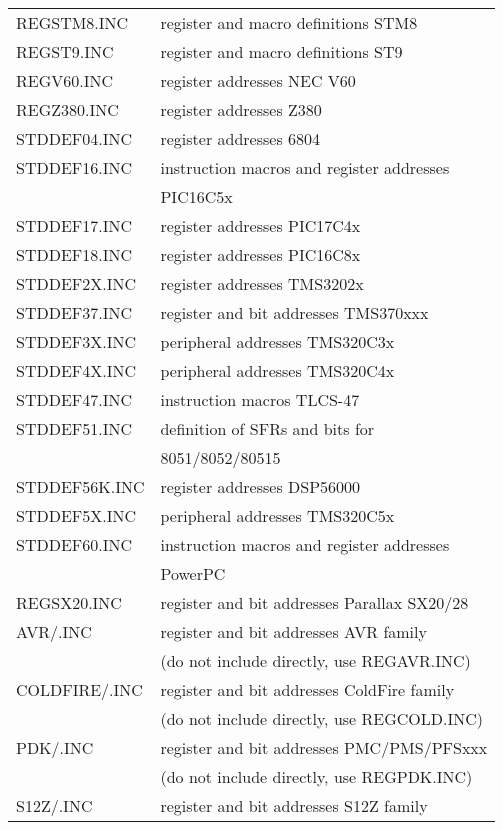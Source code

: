 \documentclass[12pt,twoside]{report}
\begin{document}
\begin{center}
\begin{longtable}{|l|l|}
REGSTM8.INC       & register and macro definitions STM8 \\
REGST9.INC        & register and macro definitions ST9 \\
REGV60.INC        & register addresses NEC V60 \\
REGZ380.INC       & register addresses Z380 \\
STDDEF04.INC      & register addresses 6804 \\
STDDEF16.INC      & instruction macros and register addresses \\
                  & PIC16C5x \\
STDDEF17.INC      & register addresses PIC17C4x \\
STDDEF18.INC      & register addresses PIC16C8x \\
STDDEF2X.INC      & register addresses TMS3202x \\
STDDEF37.INC      & register and bit addresses TMS370xxx \\
STDDEF3X.INC      & peripheral addresses TMS320C3x \\
STDDEF4X.INC      & peripheral addresses TMS320C4x \\
STDDEF47.INC      & instruction macros TLCS-47 \\
STDDEF51.INC      & definition of SFRs and bits for \\
                  & 8051/8052/80515 \\
STDDEF56K.INC     & register addresses DSP56000 \\
STDDEF5X.INC      & peripheral addresses TMS320C5x \\
STDDEF60.INC      & instruction macros and register addresses \\
                  & PowerPC \\
REGSX20.INC       & register and bit addresses Parallax SX20/28 \\
AVR/\*.INC        & register and bit addresses AVR family \\
                  & (do not include directly, use REGAVR.INC) \\
COLDFIRE/\*.INC   & register and bit addresses ColdFire family \\
                  & (do not include directly, use REGCOLD.INC) \\
PDK/\*.INC        & register and bit addresses PMC/PMS/PFSxxx \\
                  & (do not include directly, use REGPDK.INC) \\
S12Z/\*.INC       & register and bit addresses S12Z family \\

\end{longtable}
\end{center}
\end{document}
